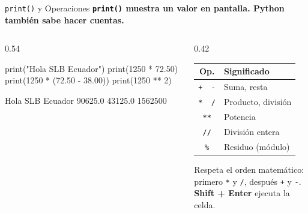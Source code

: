 \documentclass[aspectratio=169, 11pt]{beamer}
\begin{document}
\begin{frame}[fragile,shrink=10]{\texttt{print()} y Operaciones}
  \vspace{-6pt}
  {\small\color{arcaDark}\bfseries
    \texttt{print()} muestra un valor en pantalla. Python también sabe hacer cuentas.}

  \vspace{4pt}
  \begin{columns}[T]
    \begin{column}{0.54\textwidth}
      \begin{pyblock}[title={\scriptsize\faPlay\hspace{4pt}Escribamos esto en Colab}]
print("Hola SLB Ecuador")
print(1250 * 72.50)
print(1250 * (72.50 - 38.00))
print(1250 ** 2)
      \end{pyblock}
      \vspace{-2pt}
      \begin{outputblock}
Hola SLB Ecuador
90625.0
43125.0
1562500
      \end{outputblock}
    \end{column}

    \begin{column}{0.42\textwidth}
      {\footnotesize
      \renewcommand{\arraystretch}{1.25}
      \begin{tabular}{@{}c l@{}}
        \toprule
        {\bfseries\color{arcaRed} Op.} & {\bfseries\color{arcaDark} Significado} \\
        \midrule
        \texttt{+ \ -} & Suma, resta \\
        \texttt{* \ /} & Producto, división \\
        \texttt{**}    & Potencia \\
        \texttt{//}    & División entera \\
        \texttt{\%}    & Residuo (módulo) \\
        \bottomrule
      \end{tabular}
      }

      \vspace{4pt}
      {\scriptsize\color{textMuted}
        Respeta el orden matemático:
        primero \texttt{*} y \texttt{/},
        después \texttt{+} y \texttt{-}.\\[2pt]
        \textbf{Shift + Enter} ejecuta la celda.}
    \end{column}
  \end{columns}
\end{frame}
\end{document}
